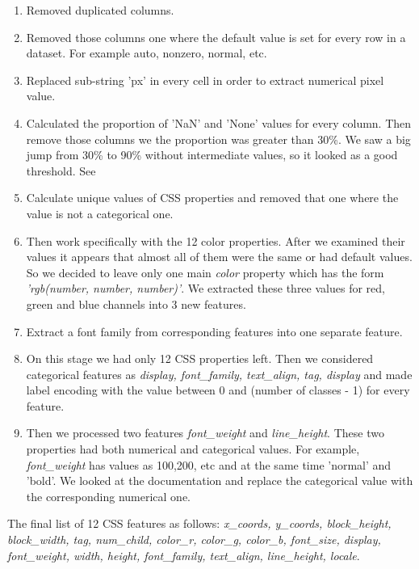 \begin{enumerate}
    \item Removed duplicated columns.
    \item Removed those columns one where the default value is set for every row in a dataset. For example auto, nonzero, normal, etc. 
    \item Replaced sub-string 'px' in every cell in order to extract numerical pixel value.
    \item Calculated the proportion of 'NaN' and 'None' values for every column. Then remove those columns we the proportion was greater than 30\%. We saw a big jump from 30\% to 90\% without intermediate values, so it looked as a good threshold. See 
    \item Calculate unique values of CSS properties and removed that one where the value is not a categorical one.   
    \item Then work specifically with the 12 color properties. After we examined their values it appears that almost all of them were the same or had default values. So we decided to leave only one main \textit{color} property which has the form \textit{'rgb(number, number, number)'}. We extracted these three values for red, green and blue channels into 3 new features. 
    \item Extract a font family from corresponding features into one separate feature.
    \item On this stage we had only 12 CSS properties left. Then we considered categorical features as \textit{display, font\_family, text\_align, tag, display} and made label encoding with the value between 0 and (number of classes - 1) for every feature.
    \item Then we processed two features \textit{font\_weight} and \textit{line\_height}. These two properties had both numerical and categorical values. For example, \textit{font\_weight} has values as 100,200, etc and at the same time 'normal' and 'bold'. We looked at the documentation and replace the categorical value with the corresponding numerical one. 
\end{enumerate}

The final list of 12 CSS features as follows: \textit{x\_coords, y\_coords, block\_height, block\_width, tag, num\_child, color\_r, color\_g, color\_b, font\_size, display, font\_weight, width, height, font\_family, text\_align, line\_height, locale}.\\

